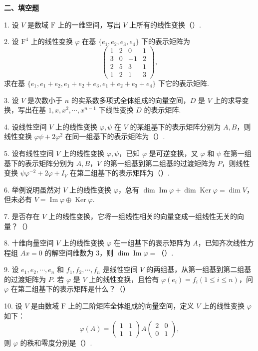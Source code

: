 \documentclass[UTF8,12pt,a4paper,fontset=fandol]{ctexart}
\begin{document}
\noindent\textbf{二、填空题}

1. 设 $V$ 是数域 $\mathrm{F}$ 上的一维空间，写出 $V$ 上所有的线性变换（\quad）.

2. 设 $\mathrm{F}^4$ 上的线性变换 $\varphi$ 在基 $\{e_1,e_2,e_3,e_4\}$ 下的表示矩阵为
\[
\left(\begin{array}{rrrr}
1 & 2 & 0 & 1\\
3 & 0 & -1 & 2\\
2 & 5 & 3 & 1\\
1 & 2 & 1 & 3
\end{array}\right),
\]
求在基 $\{e_1,e_1+e_2,e_1+e_2+e_3,e_1+e_2+e_3+e_4\}$ 下它的表示矩阵.

3. 设 $V$ 是次数小于 $n$ 的实系数多项式全体组成的向量空间，$D$ 是 $V$ 上的求导变换，写出在基 $1,x,x^2,\cdots,x^{n-1}$ 下线性变换 $D$ 的表示矩阵.

4. 设线性空间 $V$ 上的线性变换 $\varphi,\psi$ 在 $V$ 的某组基下的表示矩阵分别为 $A,B$，则线性变换 $\varphi\psi+2\varphi^2$ 在同一组基下的表示矩阵为（\quad）.

5. 设有线性空间 $V$ 上的线性变换 $\varphi,\psi$，已知 $\varphi$ 是可逆变换，又 $\varphi$ 和 $\psi$ 在第一组基下的表示矩阵分别为 $A,B$，$V$ 的第一组基到第二组基的过渡矩阵为 $P$，则线性变换 $\psi\varphi^{-2}+2\varphi+I_V$ 在第二组基下的表示矩阵为（\quad）.

6. 举例说明虽然对 $V$ 上的线性变换 $\varphi$，总有 $\dim\operatorname{Im}\varphi+\dim\operatorname{Ker}\varphi=\dim V$，但未必有 $V=\operatorname{Im}\varphi\oplus\operatorname{Ker}\varphi$.

7. 是否存在 $V$ 上的线性变换，它将一组线性相关的向量变成一组线性无关的向量？（\quad）

8. 十维向量空间 $V$ 上的线性变换 $\varphi$ 在一组基下的表示矩阵为 $A$，已知齐次线性方程组 $Ax=0$ 的解空间维数为 3，则 $\dim\operatorname{Im}\varphi=$（\quad）.

9. 设 $e_1,e_2,\cdots,e_n$ 和 $f_1,f_2,\cdots,f_n$ 是线性空间 $V$ 的两组基，从第一组基到第二组基的过渡矩阵为 $P$. 若 $\varphi$ 是 $V$ 上的线性变换，且恰有 $\varphi(e_i)=f_i(1\le i\le n)$，问 $\varphi$ 在第二组基下的表示矩阵是什么？（\quad）

10. 设 $V$ 是由数域 $\mathrm{F}$ 上的二阶矩阵全体组成的向量空间，定义 $V$ 上的线性变换 $\varphi$ 如下：
\[
\varphi(A)=\left(\begin{array}{cc}1&1\\1&1\end{array}\right)
A
\left(\begin{array}{cc}2&0\\0&1\end{array}\right),
\]
则 $\varphi$ 的秩和零度分别是（\quad）.
\end{document}
